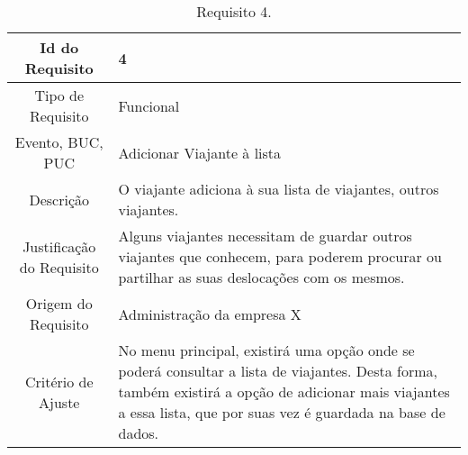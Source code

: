 \begin{table}[H]
\begin{center}
  \begin{tabularx}{\textwidth}{ | c | X | }
    \hline
    Id do Requisito & 4  \\
    
    \hline
    Tipo de Requisito & Funcional \\
    
    \hline
    Evento, BUC, PUC &  Adicionar Viajante à lista\\
    
    \hline
    Descrição & O viajante adiciona à sua lista de viajantes, outros viajantes. \\
    
    \hline
    Justificação do Requisito & Alguns viajantes necessitam de guardar outros viajantes que conhecem, para poderem procurar ou partilhar as suas deslocações com os mesmos.  \\
    
    \hline
    Origem do Requisito & Administração da empresa X \\
    
    \hline
    Critério de Ajuste & No menu principal, existirá uma opção onde se poderá consultar a lista de viajantes. Desta forma, também existirá a opção de adicionar mais viajantes a essa lista, que por suas vez é guardada na base de dados.\\
    
    \hline
  \end{tabularx}
  \caption{Requisito 4.} \label{tab:r3}
\end{center}
\end{table}

